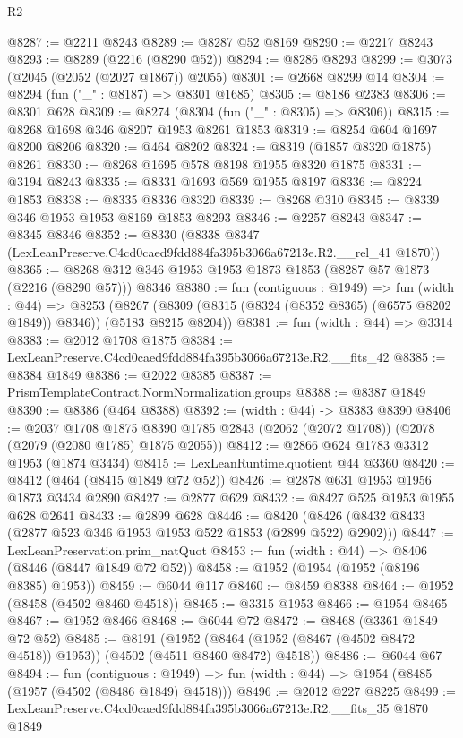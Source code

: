 \begin{lexlean}{R2}
\begin{coremodule}
@8287 := @2211 @8243
@8289 := @8287 @52 @8169
@8290 := @2217 @8243
@8293 := @8289 (@2216 (@8290 @52))
@8294 := @8286 @8293
@8299 := @3073 (@2045 (@2052 (@2027 @1867)) @2055)
@8301 := @2668 @8299 @14
@8304 := @8294 (fun ("_" : @8187) => @8301 @1685)
@8305 := @8186 @2383
@8306 := @8301 @628
@8309 := @8274 (@8304 (fun ("_" : @8305) => @8306))
@8315 := @8268 @1698 @346 @8207 @1953 @8261 @1853
@8319 := @8254 @604 @1697 @8200 @8206
@8320 := @464 @8202
@8324 := @8319 (@1857 @8320 @1875) @8261
@8330 := @8268 @1695 @578 @8198 @1955 @8320 @1875
@8331 := @3194 @8243
@8335 := @8331 @1693 @569 @1955 @8197
@8336 := @8224 @1853
@8338 := @8335 @8336 @8320
@8339 := @8268 @310
@8345 := @8339 @346 @1953 @1953 @8169 @1853 @8293
@8346 := @2257 @8243
@8347 := @8345 @8346
@8352 := @8330 (@8338 @8347 (LexLeanPreserve.C4cd0caed9fdd884fa395b3066a67213e.R2.__rel_41 @1870))
@8365 := @8268 @312 @346 @1953 @1953 @1873 @1853 (@8287 @57 @1873 (@2216 (@8290 @57))) @8346
@8380 := fun (contiguous : @1949) =>
  fun (width : @44) =>
  @8253 (@8267 (@8309 (@8315 (@8324 (@8352 @8365) (@6575 @8202 @1849)) @8346)) (@5183 @8215 @8204))
@8381 := fun (width : @44) => @3314
@8383 := @2012 @1708 @1875
@8384 := LexLeanPreserve.C4cd0caed9fdd884fa395b3066a67213e.R2.__fits_42
@8385 := @8384 @1849
@8386 := @2022 @8385
@8387 := PrismTemplateContract.NormNormalization.groups
@8388 := @8387 @1849
@8390 := @8386 (@464 @8388)
@8392 := (width : @44) -> @8383 @8390
@8406 := @2037
    @1708
    @1875
    @8390
    @1785
    @2843
    (@2062 (@2072 @1708))
    (@2078 (@2079 (@2080 @1785) @1875 @2055))
@8412 := @2866 @624 @1783 @3312 @1953 (@1874 @3434)
@8415 := LexLeanRuntime.quotient @44 @3360
@8420 := @8412 (@464 (@8415 @1849 @72 @52))
@8426 := @2878 @631 @1953 @1956 @1873 @3434 @2890
@8427 := @2877 @629
@8432 := @8427 @525 @1953 @1955 @628 @2641
@8433 := @2899 @628
@8446 := @8420 (@8426 (@8432 @8433 (@2877 @523 @346 @1953 @1953 @522 @1853 (@2899 @522) @2902)))
@8447 := LexLeanPreservation.prim_natQuot
@8453 := fun (width : @44) => @8406 (@8446 (@8447 @1849 @72 @52))
@8458 := @1952 (@1954 (@1952 (@8196 @8385) @1953))
@8459 := @6044 @117
@8460 := @8459 @8388
@8464 := @1952 (@8458 (@4502 @8460 @4518))
@8465 := @3315 @1953
@8466 := @1954 @8465
@8467 := @1952 @8466
@8468 := @6044 @72
@8472 := @8468 (@3361 @1849 @72 @52)
@8485 := @8191
    (@1952 (@8464 (@1952 (@8467 (@4502 @8472 @4518)) @1953)) (@4502 (@4511 @8460 @8472) @4518))
@8486 := @6044 @67
@8494 := fun (contiguous : @1949) =>
  fun (width : @44) => @1954 (@8485 (@1957 (@4502 (@8486 @1849) @4518)))
@8496 := @2012 @227 @8225
@8499 := LexLeanPreserve.C4cd0caed9fdd884fa395b3066a67213e.R2.__fits_35 @1870 @1849

\end{coremodule}
\end{lexlean}
